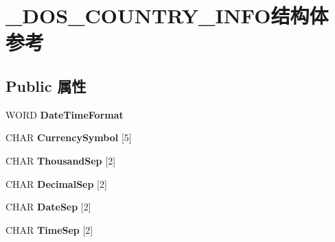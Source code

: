 \hypertarget{struct___d_o_s___c_o_u_n_t_r_y___i_n_f_o}{}\section{\+\_\+\+D\+O\+S\+\_\+\+C\+O\+U\+N\+T\+R\+Y\+\_\+\+I\+N\+F\+O结构体 参考}
\label{struct___d_o_s___c_o_u_n_t_r_y___i_n_f_o}
\subsection*{Public 属性}
\begin{DoxyCompactItemize}
\item 
\mbox{\label{struct___d_o_s___c_o_u_n_t_r_y___i_n_f_o_a163b27acd0c8ec5b293de8719642cc22}} 
W\+O\+RD {\bfseries Date\+Time\+Format}
\item 
\mbox{\label{struct___d_o_s___c_o_u_n_t_r_y___i_n_f_o_a1810bde63b01d446f29e9490da7c2281}} 
C\+H\+AR {\bfseries Currency\+Symbol} \mbox{[}5\mbox{]}
\item 
\mbox{\label{struct___d_o_s___c_o_u_n_t_r_y___i_n_f_o_ad7278561b62001973bcd3d6e0789c94a}} 
C\+H\+AR {\bfseries Thousand\+Sep} \mbox{[}2\mbox{]}
\item 
\mbox{\label{struct___d_o_s___c_o_u_n_t_r_y___i_n_f_o_af85f6c7fb5ba55dedf6e0235f152c685}} 
C\+H\+AR {\bfseries Decimal\+Sep} \mbox{[}2\mbox{]}
\item 
\mbox{\label{struct___d_o_s___c_o_u_n_t_r_y___i_n_f_o_a5d510be99a3e24f020ee9bb5aaf9d1ba}} 
C\+H\+AR {\bfseries Date\+Sep} \mbox{[}2\mbox{]}
\item 
\mbox{\label{struct___d_o_s___c_o_u_n_t_r_y___i_n_f_o_ad325b1ce0c761eacfa1f183bf616d4cf}} 
C\+H\+AR {\bfseries Time\+Sep} \mbox{[}2\mbox{]}
\item 
\mbox{\label{struct___d_o_s___c_o_u_n_t_r_y___i_n_f_o_ae1b3f25e1a65b64b33bae30730542c76}} 

\end{DoxyCompactItemize}
